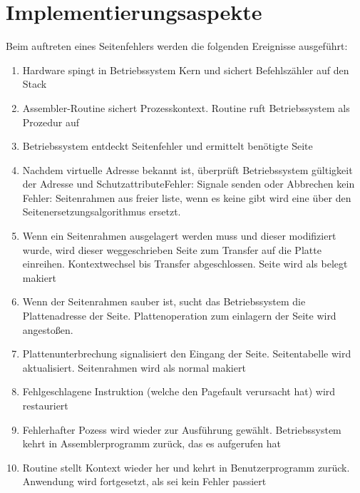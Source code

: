 \pagebreak

\section{Implementierungsaspekte}

Beim auftreten eines Seitenfehlers werden die folgenden Ereignisse
aus\-ge\-führt:

\begin{enumerate}
    \item Hardware spingt in Betriebssystem Kern und sichert Befehlszähler auf den Stack
    \item Assembler-Routine sichert Prozesskontext. Routine ruft Be\-triebs\-sys\-tem als
          Prozedur auf
    \item Betriebssystem entdeckt Seitenfehler und ermittelt benötigte Seite
    \item Nachdem virtuelle Adresse bekannt ist, überprüft Betriebssystem gül\-tig\-keit
          der Adresse und Schutzattribute\newline Fehler: Signale senden oder Abbrechen
          \newline kein Fehler: Seitenrahmen aus freier liste, wenn es keine gibt wird
          eine über den Seitenersetzungsalgorithmus ersetzt.
    \item Wenn ein Seitenrahmen ausgelagert werden muss und dieser modifiziert wurde,
          wird dieser weggeschrieben Seite zum Transfer auf die Platte einreihen.
          Kontextwechsel bis Transfer abgeschlossen. Seite wird als belegt makiert
    \item Wenn der Seitenrahmen sauber ist, sucht das Betriebssystem die
          Platt\-en\-ad\-res\-se der Seite. Plattenoperation zum einlagern der Seite wird
          angestoßen.
    \item Plattenunterbrechung signalisiert den Eingang der Seite. Seitentabelle wird
          aktualisiert. Seitenrahmen wird als normal makiert
    \item Fehlgeschlagene Instruktion (welche den Pagefault verursacht hat) wird
          restauriert
    \item Fehlerhafter Pozess wird wieder zur Ausführung gewählt. Be\-triebs\-sys\-tem
          kehrt in Assemblerprogramm zurück, das es aufgerufen hat
    \item Routine stellt Kontext wieder her und kehrt in Benutzerprogramm zurück.
          Anwendung wird fortgesetzt, als sei kein Fehler passiert
\end{enumerate}


